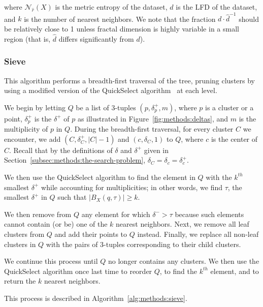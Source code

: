 where $\mathcal{N}_{\hat{r}}(X)$ is the metric entropy of the dataset, $d$ is the LFD of the dataset, and $k$ is the number of nearest neighbors.
We note that the fraction $d \cdot \hat{d}^{-1}$ should be relatively close to 1 unless fractal dimension is highly variable in a small region (that is, $\hat{d}$ differs significantly from $d$).


\subsubsection{Sieve}
\label{subsubsec:methods:knn:sieve}

This algorithm performs a breadth-first traversal of the tree, pruning clusters by using a modified version of the QuickSelect algorithm~\cite{hoare1961algorithm} at each level.

We begin by letting $Q$ be a list of 3-tuples $(p, \delta^{+}_{p}, m)$, where $p$ is a cluster or a point, $\delta^{+}_{p}$ is the $\delta^{+}$ of $p$ as illustrated in Figure~\ref{fig:methods:deltas}, and $m$ is the multiplicity of $p$ in $Q$.
During the breadth-first traversal, for every cluster $C$ we encounter, we add $(C, \delta^{+}_{C}, |C| - 1)$ and $(c, \delta_{C}, 1)$ to $Q$, where $c$ is the center of $C$.
Recall that by the definitions of $\delta$ and $\delta^{+}$ given in Section~\ref{subsec:methods:the-search-problem}, $\delta_{C} = \delta_{c} = \delta^{+}_{c}$.



We then use the QuickSelect algorithm to find the element in $Q$ with the $k^{th}$ smallest $\delta^{+}$ while accounting for multiplicities; in other words, we find $\tau$, the smallest $\delta^{+}$ in $Q$ such that $\left| B_X(q, \tau) \right| \geq k$.

We then remove from $Q$ any element for which $\delta^{-} > \tau$ because such elements cannot contain (or be) one of the $k$ nearest neighbors.
Next, we remove all leaf clusters from $Q$ and add their points to $Q$ instead.
Finally, we replace all non-leaf clusters in $Q$ with the pairs of 3-tuples corresponding to their child clusters.

We continue this process until $Q$ no longer contains any clusters.
We then use the QuickSelect algorithm once last time to reorder $Q$, to find the $k^{th}$ element, and to return the $k$ nearest neighbors.

This process is described in Algorithm~\ref{alg:methods:sieve}. 

